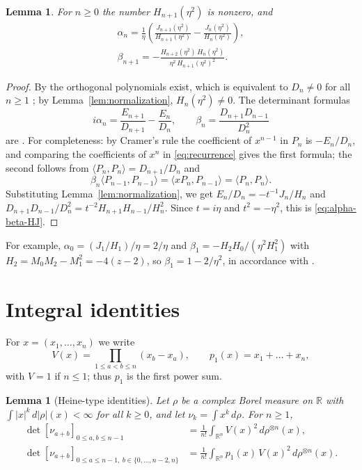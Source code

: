\documentclass[11pt]{amsart}
\newtheorem{lemma}[theorem]{Lemma}
\theoremstyle{remark}
\numberwithin{equation}{section}
\newcommand{\R}{\mathbb{R}}
\newcommand{\abs}[1]{\lvert #1\rvert}
\begin{document}
\begin{lemma}\label{lem:alpha-beta}
For $n\ge0$ the number $H_{n+1}(\eta^2)$ is nonzero, and
\begin{equation}\label{eq:alpha-beta-HJ}
\begin{gathered}
\alpha_n=\frac1\eta\left(\frac{J_{n+1}(\eta^2)}{H_{n+1}(\eta^2)}-\frac{J_n(\eta^2)}{H_n(\eta^2)}\right),\\
\beta_{n+1}=-\frac{H_{n+2}(\eta^2)\,H_n(\eta^2)}{\eta^2\,H_{n+1}(\eta^2)^2}.
\end{gathered}
\end{equation}
\end{lemma}

\begin{proof}
By \cite[Theorem~2.3]{MC} the orthogonal polynomials exist, which is equivalent to $D_n\ne0$ for all $n\ge1$ \cite[Theorem~2.2]{MC}; by Lemma~\ref{lem:normalization}, $H_n(\eta^2)\ne0$. The determinant formulas
\[
i\alpha_n=\frac{E_{n+1}}{D_{n+1}}-\frac{E_n}{D_n},\qquad \beta_{n}=\frac{D_{n+1}D_{n-1}}{D_n^2}
\]
are \cite[(3.2)]{MC}. For completeness: by Cramer's rule the coefficient of $x^{n-1}$ in $P_n$ is $-E_n/D_n$, and comparing the coefficients of $x^n$ in \eqref{eq:recurrence} gives the first formula; the second follows from $\langle P_n,P_n\rangle=D_{n+1}/D_n$ and
\[
\beta_n\langle P_{n-1},P_{n-1}\rangle=\langle xP_n,P_{n-1}\rangle=\langle P_n,P_n\rangle .
\]
Substituting Lemma~\ref{lem:normalization}, we get $E_n/D_n=-t^{-1}J_n/H_n$ and $D_{n+1}D_{n-1}/D_n^2=t^{-2}H_{n+1}H_{n-1}/H_n^2$. Since $t=i\eta$ and $t^2=-\eta^2$, this is \eqref{eq:alpha-beta-HJ}.
\end{proof}

For example, $\alpha_0=(J_1/H_1)/\eta=2/\eta$ and $\beta_1=-H_2H_0/(\eta^2H_1^2)$ with $H_2=M_0M_2-M_1^2=-4(z-2)$, so $\beta_1=1-2/\eta^2$, in accordance with \cite[Table~4]{LZ}.

\section{Integral identities}\label{sec:integrals}

For $x=(x_1,\dots,x_n)$ we write
\[
V(x)=\prod_{1\le a<b\le n}(x_b-x_a),\qquad p_1(x)=x_1+\dots+x_n,
\]
with $V=1$ if $n\le1$; thus $p_1$ is the first power sum.

\begin{lemma}[Heine-type identities]\label{lem:heine}
Let $\rho$ be a complex Borel measure on $\R$ with $\int\abs{x}^k\,d\abs{\rho}(x)<\infty$ for all $k\ge0$, and let $\nu_k=\int x^k\,d\rho$. For $n\ge1$,
\begin{align*}
\det[\nu_{a+b}]_{0\le a,b\le n-1}&=\frac1{n!}\int_{\R^n}V(x)^2\,d\rho^{\otimes n}(x),\\
\det[\nu_{a+b}]_{0\le a\le n-1,\ b\in\{0,\dots,n-2,n\}}&=\frac1{n!}\int_{\R^n}p_1(x)\,V(x)^2\,d\rho^{\otimes n}(x).
\end{align*}
\end{lemma}
\end{document}
